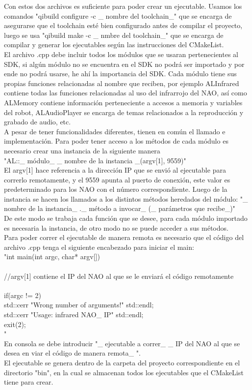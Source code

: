 \documentclass[letterpaper]{article}
\begin{document}
Con estos dos archivos es suficiente para poder crear un ejecutable. Usamos los comandos "qibuild configure -c \_ nombre del toolchain\_" que se encarga de asegurarse que el toolchain esté bien configurado antes de compilar el proyecto, luego se usa "qibuild make -c \_ nmbre del toolchain\_" que se encarga de compilar y generar los ejecutables según las instrucciones del CMakeList.\\
El archivo .cpp debe incluir todos los módulos que se usaran pertenecientes al SDK, si algún módulo no se encuentra en el SDK no podrá ser importado y por ende no podrá usarse, he ahí la importancia del SDK. Cada módulo tiene sus propias funciones relacionadas al nombre que reciben, por ejemplo ALInfrared contiene todas las funciones relacionadas al uso del infrarrojo del NAO, así como ALMemory contiene información perteneciente a accesos a memoria y variables del robot, ALAudioPlayer se encarga de temas relacionados a la reproducción y grabado de audio, etc. \\
A pesar de tener funcionalidades diferentes, tienen en común el llamado e implementación. Para poder tener acceso a los métodos de cada módulo es necesario crear una instancia de la siguiente manera\\
"AL::\_ módulo\_ \_ nombre de la instancia \_(argv[1], 9559)"\\
El argv[1] hace referencia a la dirección IP que se envió al ejecutable para correrlo remotamente, y el 9559 apunta al puerto de conexión, este valor es predeterminado para los NAO con el número correspondiente. Luego de la instancia se hacen los llamados a los distintos métodos heredados del módulo: "\_ nombre de la instancia\_ .\_ método a invocar\_ (\_ parámetros que recibe\_)"\\
De este modo se trabaja cada función que se desee, para cada módulo importado es necesaria la instancia, de otro modo no se puede acceder a sus métodos.\\
Para poder correr el ejecutable de manera remota es necesario que el código del archivo .cpp tenga el siguiente encabezado para iniciar el main:\\
"int main(int argc, char* argv[]) \\
\\
	//argv[1] contiene el IP del NAO al que se le enviará el código remotamente\\
\\
  if(argc != 2)\\
    std::cerr \< \< "Wrong number of arguments!" \< \< std::endl;\\
    std::cerr \< \< "Usage: infrared NAO\_ IP" \< \< std::endl;\\
    exit(2);\\
  "\\
En consola se debe introducir "\_ ejecutable a correr\_  \_ IP del NAO al que se desea en viar el código de manera remota\_ ".\\
El ejecutable se genera dentro de la carpeta del proyecto correspondiente en el directorio "bin", en la cual se almacenan todos los ejecutables que el CMakeList tiene para crear.\\
\end{document}
